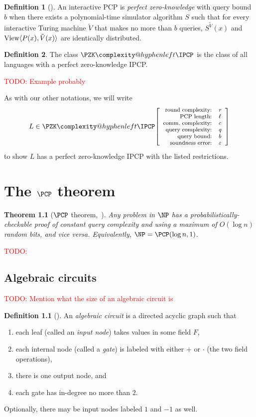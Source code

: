 \documentclass[english,12pt]{reedthesis}
\makeatletter
\theoremstyle{plain}
\newtheorem{thm}{Theorem}[section]
\theoremstyle{definition}
\newtheorem{defn}[defn]{Definition}
\theoremstyle{remark}
\DeclareMathOperator{\View}{View}
\DeclarePairedDelimiter{\ang}{\langle}{\rangle}
\newcommand{\pzkipcp}[6]{%
  \ensuremath%
  \mleft[{\footnotesize\begin{array}{r l}
    \text{round complexity:} & #1 \\
    \text{PCP length:} & #2 \\
    \text{comm.\ complexity:} & #3 \\
    \text{query complexity:} & #4 \\
    \text{query bound:} & #5 \\
    \text{soundness error:} & #6
  \end{array}}\mright]%
}
\newcommand{\PZKIPCP}{%
  \PZK\complexity@hyphenleft\IPCP
}
\newcommand{\TODO}[1]{\textcolor{red}{TODO: #1}}
\makeatother
\begin{document}
\begin{defn}[{\cite[]{CFGS22}}]\label{def:zk-ipcp}
  An interactive PCP is \emph{perfect zero-knowledge} with query bound $b$ when
  there exists a polynomial-time simulator algorithm $S$ such that for every
  interactive Turing machine $\tilde{V}$ that makes no more than $b$ queries,
  $S^{\tilde{V}}(x)$ and $\View\ang{P(x), \tilde{V}(x)}$ are identically
  distributed.
\end{defn}

\begin{defn}\label{def:pzkipcp}\index{PZK-IPCP@$\PZKIPCP$}
  The class $\PZKIPCP$ is the class of all languages with a perfect
  zero-knowledge IPCP.
\end{defn}

\TODO{Example probably}

As with our other notations, we will write
\[
  L \in \PZKIPCP\pzkipcp{r}{\ell}{c}{q}{b}{\varepsilon}
\]
to show $L$ has a perfect zero-knowledge IPCP with the listed restrictions.

\chapter{The $\PCP$ theorem}\label{chap:pcp-theorem}

\begin{thm}[{$\PCP$ theorem,~\cite{AS98}}]\label{thm:pcp-theorem}
  Any problem in $\NP$ has a probabilistically-checkable proof of constant query
  complexity and using a maximum of $O(\log n)$ random bits, and vice versa.
  Equivalently, $\NP = \PCP(\log n, 1)$.
\end{thm}

\TODO{}

\section{Algebraic circuits}\label{sec:alg-circuit}

\TODO{Mention what the size of an algebraic circuit is}

\begin{defn}[{\cite[]{AB09}}]\label{def:alg-circuit}
  An \emph{algebraic circuit} is a directed acyclic graph such that
  \begin{enumerate}
    \item each leaf (called an \emph{input node}) takes values in some field
          $F$,
    \item each internal node (called a \emph{gate}) is labeled with either $+$
          or $\cdot$ (the two field operations),
    \item there is one output node, and
    \item each gate has in-degree no more than $2$.
  \end{enumerate}
  Optionally, there may be input nodes labeled $1$ and $-1$ as well.
\end{defn}
\end{document}
